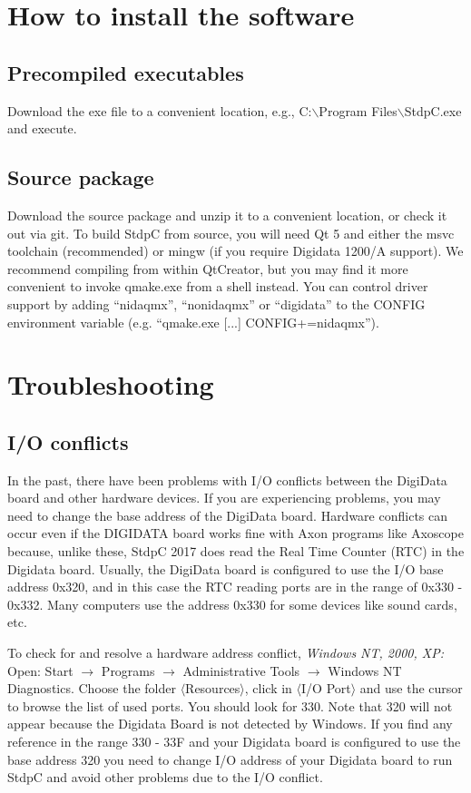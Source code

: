 \documentclass{article}
\begin{document}
\section{How to install the software}

\subsection{Precompiled executables}
Download the exe file to a convenient location, e.g.,
C:$\backslash$Program Files$\backslash$StdpC.exe and execute.

\subsection{Source package}
Download the source package and unzip it to a convenient
location, or check it out via git. To build StdpC from source, you will need Qt 5 
and either the msvc toolchain (recommended) or mingw (if you require Digidata 1200/A support).
We recommend compiling from within QtCreator, but you may find it more convenient to invoke
qmake.exe from a shell instead. You can control driver support by adding ``nidaqmx'',
``nonidaqmx'' or ``digidata'' to the CONFIG environment variable 
(e.g. ``qmake.exe [...] CONFIG+=nidaqmx'').

\section{Troubleshooting}
\subsection{I/O conflicts}
 
In the past, there have been problems with I/O conflicts between the
DigiData board and other hardware devices. If you are experiencing
problems, you may need to change the base address of the DigiData
board. Hardware conflicts can occur even if the DIGIDATA board works
fine with Axon programs like Axoscope because, unlike these, StdpC
2017 does read the Real Time Counter (RTC) in the Digidata
board. Usually, the DigiData board is configured to use the I/O base
address 0x320, and in this case the RTC reading ports are in the range
of 0x330 - 0x332. Many computers use the address 0x330 for some devices like
sound cards, etc.

To check for and resolve a hardware address conflict,
\noindent
{\em Windows NT, 2000, XP: } \\
Open: Start $\rightarrow$ Programs $\rightarrow$ Administrative Tools
$\rightarrow$ Windows NT Diagnostics. Choose the folder
$\langle$Resources$\rangle$, click in $\langle$I/O Port$\rangle$ and use the
cursor to browse the list of used ports.  You should look for 330. Note that
320 will not appear because the Digidata Board is not detected by Windows. If
you find any reference in the range 330 - 33F and your Digidata board is
configured to use the base address 320 you need to change I/O address of your
Digidata board to run StdpC and avoid other problems due to the I/O
conflict.
\end{document}
